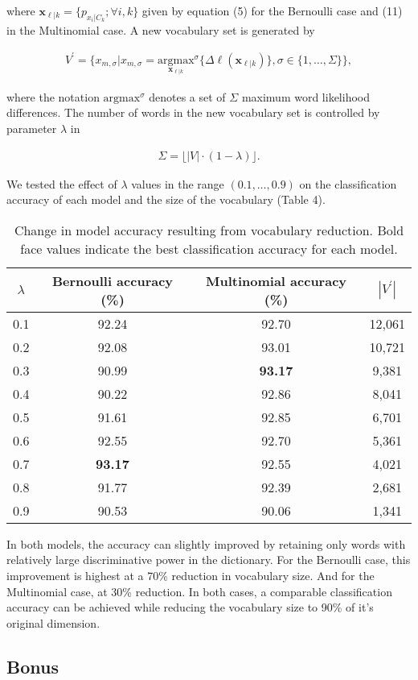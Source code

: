 \documentclass{article}
\renewcommand{\vec}[1]{\mathbf{#1}}
\begin{document}
\noindent
where $\vec{x}_{\ell|k} = \{p_{x_i|C_k}; \forall i,k\}$ given by equation (5) for the Bernoulli case and (11) in the Multinomial case. A new vocabulary set is generated by

\begin{align}
V^{\prime} = \{x_{m,\sigma} | x_{m,\sigma} = \underset{\vec{x}_{\ell|k}}{\mathrm{argmax}}^\sigma \{\Delta \ell(\vec{x}_{\ell|k})\}, \sigma \in \{1, \dots ,\Sigma\}\},
\end{align}

\noindent
where the notation $\mathrm{argmax}^\sigma$ denotes a set of $\Sigma$ maximum word likelihood differences. The number of words in the new vocabulary set is controlled by parameter $\lambda$ in 

\begin{align}
\Sigma = \lfloor|V| \cdot (1-\lambda)\rfloor.
\end{align}

\noindent
We tested the effect of $\lambda$ values in the range $(0.1,\dots,0.9)$ on the classification accuracy of each model and the size of the vocabulary (Table 4).

\begin{table}[!htb]
\centering
\caption{Change in model accuracy resulting from vocabulary reduction. Bold face values indicate the best classification accuracy for each model.}
\begin{tabular}{|c|c|c|c|} \hline
	$\lambda$ & Bernoulli accuracy (\%) & Multinomial accuracy (\%) & $|V^{\prime}|$ \\ \hline
	0.1 & 92.24 & 92.70 & 12,061 \\ \hline
	0.2 & 92.08 & 93.01 & 10,721 \\ \hline
	0.3 & 90.99 & \textbf{93.17} & 9,381 \\ \hline
	0.4 & 90.22 & 92.86 & 8,041 \\ \hline
	0.5 & 91.61 & 92.85 & 6,701 \\ \hline
	0.6 & 92.55 & 92.70 & 5,361 \\ \hline
	0.7 & \textbf{93.17} & 92.55 & 4,021 \\ \hline
	0.8 & 91.77 & 92.39 & 2,681 \\ \hline
	0.9 & 90.53 & 90.06 & 1,341 \\ \hline
\end{tabular}
\end{table}

\noindent
In both models, the accuracy can slightly improved by retaining only words with relatively large discriminative power in the dictionary. For the Bernoulli case, this improvement is highest at a 70\% reduction in vocabulary size. And for the Multinomial case, at 30\% reduction. In both cases, a comparable classification accuracy can be achieved while reducing the vocabulary size to 90\% of it's original dimension.

\subsection{Bonus}
\end{document}
